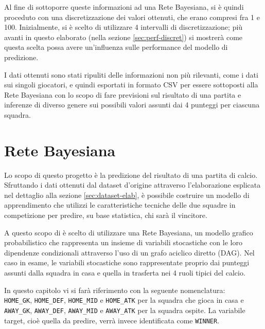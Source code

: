 \documentclass[hidelinks, 12pt]{article}
\begin{document}
Al fine di sottoporre queste informazioni ad una Rete Bayesiana, si è quindi proceduto con una discretizzazione dei valori ottenuti, che erano compresi fra 1 e 100. Inizialmente, si è scelto di utilizzare 4 intervalli di discretizzazione; più avanti in questo elaborato (nella sezione \ref{sec:perf-discret}) si mostrerà come questa scelta possa avere un'influenza sulle performance del modello di predizione.

\vspace{5ex}

I dati ottenuti sono stati ripuliti delle informazioni non più rilevanti, come i dati sui singoli giocatori, e quindi esportati in formato CSV per essere sottoposti alla Rete Bayesiana con lo scopo di fare previsioni sul risultato di una partita e inferenze di diverso genere sui possibili valori assunti dai 4 punteggi per ciascuna squadra.



\clearpage



\section{Rete Bayesiana}

Lo scopo di questo progetto è la predizione del risultato di una partita di calcio. Sfruttando i dati ottenuti dal dataset d'origine attraverso l'elaborazione esplicata nel dettaglio alla sezione \ref{sec:dataset-elab}, è possibile costruire un modello di apprendimento che utilizzi le caratteristiche tecniche delle due squadre in competizione per predire, su base statistica, chi sarà il vincitore.

A questo scopo di è scelto di utilizzare una Rete Bayesiana, un modello grafico probabilistico che rappresenta un insieme di variabili stocastiche con le loro dipendenze condizionali attraverso l'uso di un grafo aciclico diretto (DAG). Nel caso in esame, le variabili stocastiche sono rappresentate proprio dai punteggi assunti dalla squadra in casa e quella in trasferta nei 4 ruoli tipici del calcio. 

In questo capitolo vi si farà riferimento con la seguente nomenclatura: \\
\texttt{HOME\_GK}, \texttt{HOME\_DEF}, \texttt{HOME\_MID} e \texttt{HOME\_ATK} per la squadra che gioca in casa e \\
\texttt{AWAY\_GK}, \texttt{AWAY\_DEF}, \texttt{AWAY\_MID} e \texttt{AWAY\_ATK} per la squadra ospite.
La variabile target, cioè quella da predire, verrà invece identificata come \texttt{WINNER}.
\end{document}
